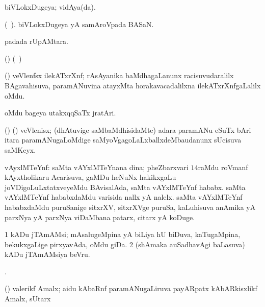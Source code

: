 \bentry 
{} 
\gl{\gu}
\expl{}
\bmng
 biVLokxDugeya; vidAya(da). 
\emng
\eentry

\bentry
{} 
\gl{\nA}(\bava\ ). 
\bmng
 biVLokxDugeya yA samAroVpada BASaN. 
\emng
\eentry

\bentry
{} 
\gl{\nA}
\expl{}
\bmng
  padada rUpAMtara. 
\emng
\eentry

\bentry
{} 
\gl{\nA}
\expl{}
\bmng
 (\ravi) (\kanmu\ \ame)  
\emng
\eentry

\bentry 
{}
\gl{\nA}
\expl{}
\bmng
 (\ravi) veVlenfsx ilekATxrXnf; rAsAyanika baMdhagaLanunx racisuvudaralilx BAgavahisuva, paramANuvina atayxMta horakavacadalilxna ilekATxrXnfgaLalilx oMdu. 
\emng
\eentry

\bentry
{} 
\gl{\nA}
\expl{}
\bmng
oMdu bageya utakxqqSaTx jratAri. 
\emng
\eentry

\bentry
{} 
\gl{\nA}
\bmng
 (\birx) (\ravi) veVlenisx; (dhAtuvige saMbaMdhisidaMte) adara paramANu eSuTx bAri itara paramANugaLoMdige saMyoVgagoLaLxballxdeMbaudanunx sUcisuva saMKeyx. 
\emng
\eentry

\bentry
{} 
\gl{\nA}
\expl{}
\bmng
 vAyxlMTeYnf: 
\banum
{} saMta vAYxlMTeYnana dina; pheZbarxvari $14$raMdu roVmanf kAyxtholikaru Acarisuva, gaMDu heNuNx hakikxgaLu joVDigoLuLxtatxveyeMdu BAvisalAda, saMta vAYxlMTeYnf hababx. 
 saMta vAYxlMTeYnf hababxdaMdu varisida nallx yA nalelx. 
 saMta vAYxlMTeYnf hababxdaMdu puruSanige sitxrXV, sitxrXVge puruSa, kaLuhisuva anAmika yA parxNya yA parxNya viDaMbana patarx, citarx yA koDuge. 
\eanum
\emng
\eentry

\bentry
{} 
\gl{\nA}
\expl{}
\bmng
\bnum
\num{1} kADu jTAmAMsi; mAsalugeMpina yA biLiya hU biDuva, kaTugaMpina, bekukxgaLige pirxyavAda, oMdu giDa. 
\num{2} (shAmaka auSadhavAgi baLasuva) kADu jTAmAMsiya beVru. 
\enum
\emng

\noindent
\gl{\pagu}
\bmng
{}. 
\emng
\eentry


\bentry
{} 
\gl{\nA}
\expl{}
\bmng
 (\ravi) valerikf Amalx; aidu kAbaRnf paramANugaLiruva payARpatx kAbARkisxlikf Amalx, sUtarx  
\emng
\eentry

